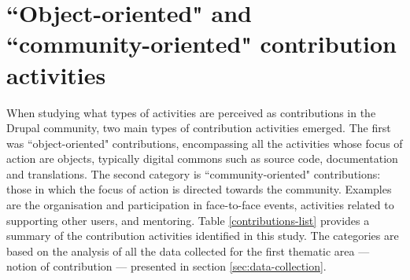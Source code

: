 \section{``Object-oriented" and ``community-oriented" contribution activities}
\label{subsec:insights:contrib-beyond-source-code}

When studying what types of activities are perceived as contributions in the Drupal community, two main types of contribution activities emerged. The first was ``object-oriented" contributions, encompassing all the activities whose focus of action are objects, typically digital commons such as source code, documentation and translations. The second category is ``community-oriented" contributions: those in which the focus of action is directed towards the community. Examples are the organisation and participation in face-to-face events, activities related to supporting other users, and mentoring. Table \ref{contributions-list} provides a summary of the contribution activities identified in this study. The categories are based on the analysis of all the data collected for the first thematic area --- notion of contribution --- presented in section \ref{sec:data-collection}.



    \scriptsize

    \setlength\LTleft{0pt}
    \setlength\LTright{0pt}

